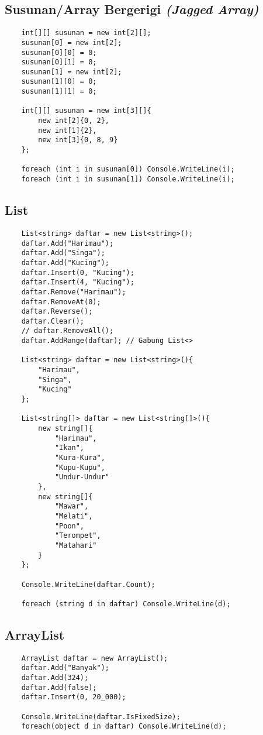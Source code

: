 \documentclass{book}
\begin{document}
	\subsection{Susunan/Array Bergerigi \textit{(Jagged Array)}}
	\begin{lstlisting}
	int[][] susunan = new int[2][];
	susunan[0] = new int[2];
	susunan[0][0] = 0;
	susunan[0][1] = 0;
	susunan[1] = new int[2];
	susunan[1][0] = 0;
	susunan[1][1] = 0;
	
	int[][] susunan = new int[3][]{
		new int[2]{0, 2},
		new int[1]{2},
		new int[3]{0, 8, 9}
	};
	
	foreach (int i in susunan[0]) Console.WriteLine(i);
	foreach (int i in susunan[1]) Console.WriteLine(i);
	\end{lstlisting}
	
	\subsection{List}
	\begin{lstlisting}
	List<string> daftar = new List<string>();
	daftar.Add("Harimau");
	daftar.Add("Singa");
	daftar.Add("Kucing");
	daftar.Insert(0, "Kucing");
	daftar.Insert(4, "Kucing");
	daftar.Remove("Harimau");
	daftar.RemoveAt(0);
	daftar.Reverse();
	daftar.Clear();
	// daftar.RemoveAll();
	daftar.AddRange(daftar); // Gabung List<>
	
	List<string> daftar = new List<string>(){
		"Harimau",
		"Singa",
		"Kucing"
	};
	
	List<string[]> daftar = new List<string[]>(){
		new string[]{
			"Harimau",
			"Ikan",
			"Kura-Kura",
			"Kupu-Kupu",
			"Undur-Undur"
		},
		new string[]{
			"Mawar",
			"Melati",
			"Poon",
			"Terompet",
			"Matahari"
		}
	};
	
	Console.WriteLine(daftar.Count);
	
	foreach (string d in daftar) Console.WriteLine(d);
	\end{lstlisting}
	
	\subsection{ArrayList}
	\begin{lstlisting}
	ArrayList daftar = new ArrayList();
	daftar.Add("Banyak");
	daftar.Add(324);
	daftar.Add(false);
	daftar.Insert(0, 20_000);
	
	Console.WriteLine(daftar.IsFixedSize);
	foreach(object d in daftar) Console.WriteLine(d);
	\end{lstlisting}
	
\end{document}
